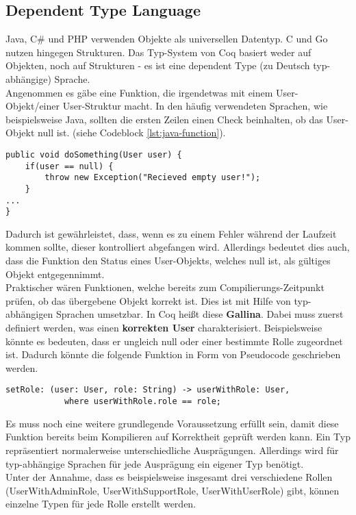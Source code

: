 \subsection{Dependent Type Language}
Java, C\# und PHP verwenden Objekte als universellen Datentyp. C und Go nutzen hingegen Strukturen. Das Typ-System von Coq basiert weder auf Objekten, noch auf Strukturen - es ist eine dependent Type (zu Deutsch typ-abhängige) Sprache.\\
Angenommen es gäbe eine Funktion, die irgendetwas mit einem User-Objekt/einer User-Struktur macht. In den häufig verwendeten Sprachen, wie beispielsweise Java, sollten die ersten Zeilen einen Check beinhalten, ob das User-Objekt null ist. (siehe Codeblock \ref{lst:java-function}).
\begin{lstlisting}[language=coq,firstnumber=1,caption=Java Funktion für den initialen Check auf null des User Objektes,label=lst:java-function]
public void doSomething(User user) {
	if(user == null) {
		throw new Exception("Recieved empty user!");
	}
...
}
\end{lstlisting}
Dadurch ist gewährleistet, dass, wenn es zu einem Fehler während der Laufzeit kommen sollte, dieser kontrolliert abgefangen wird. Allerdings bedeutet dies auch, dass die Funktion den Status eines User-Objekts, welches null ist, als gültiges Objekt entgegennimmt.\\
Praktischer wären Funktionen, welche bereits zum Compilierungs-Zeitpunkt prüfen, ob das übergebene Objekt korrekt ist.
Dies ist mit Hilfe von typ-abhängigen Sprachen umsetzbar. In Coq heißt diese \textbf{Gallina}. Dabei muss zuerst definiert werden, was einen \textbf{korrekten User} charakterisiert. Beispielsweise könnte es bedeuten, dass er ungleich null oder einer bestimmte Rolle zugeordnet ist. Dadurch könnte die folgende Funktion in Form von Pseudocode geschrieben werden.
\begin{lstlisting}[language=coq,firstnumber=1,caption=Pseudocode Check auf null des User Objektes,label=lst:pseudocode-checked-function]
setRole: (user: User, role: String) -> userWithRole: User,
			where userWithRole.role == role;
\end{lstlisting}
Es muss noch eine weitere grundlegende Voraussetzung erfüllt sein, damit diese Funktion bereits beim Kompilieren auf Korrektheit geprüft werden kann. Ein Typ repräsentiert normalerweise unterschiedliche Ausprägungen. Allerdings wird für typ-abhängige Sprachen für jede Ausprägung ein eigener Typ benötigt.\\
Unter der Annahme, dass es beispielsweise insgesamt drei verschiedene Rollen (UserWithAdminRole, UserWithSupportRole, UserWithUserRole) gibt, können einzelne Typen für jede Rolle erstellt werden.
